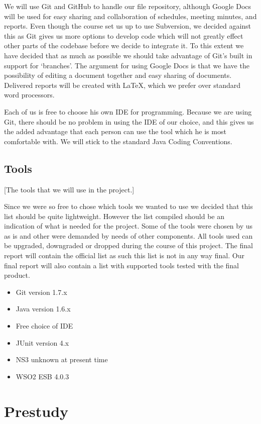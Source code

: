 \documentclass[12pt]{article}
\begin{document}
    We will use Git and GitHub to handle our file repository, although Google Docs will be used for easy sharing and collaboration of schedules, meeting minutes, and reports. Even though the course set us up to use Subversion, we decided against this as Git gives us more options to develop code which will not greatly effect other parts of the codebase before we decide to integrate it. To this extent we have decided that as much as possible we should take advantage of Git’s built in support for ‘branches’. The argument for using Google Docs is that we have the possibility of editing a document together and easy sharing of documents. Delivered reports will be created with LaTeX, which we prefer over standard word processors.

    Each of us is free to choose his own IDE for programming. Because we are using Git, there should be no problem in using the IDE of our choice, and this gives us the added advantage that each person can use the tool which he is most comfortable with. We will stick to the standard Java Coding Conventions.

    \subsection{Tools}\label{tools} [The tools that we will use in the project.]
    
    Since we were so free to chose which tools we wanted to use we decided that this list should be quite lightweight. However the list compiled should be an indication of what is needed for the project. Some of the tools were chosen by us as is and other were demanded by needs of other components. All tools used can be  upgraded, downgraded or dropped during the course of this project. The final report will contain the official list as such this list is not in any way final. Our final report will also contain a list with supported tools tested with the final product.
    \begin{itemize}
        \item Git version 1.7.x
        \item Java version 1.6.x
        \item Free choice of IDE
        \item JUnit version 4.x
        \item NS3 unknown at present time
        \item WSO2 ESB 4.0.3
    \end{itemize}
\section{Prestudy}\label{prestudy}
\end{document}
